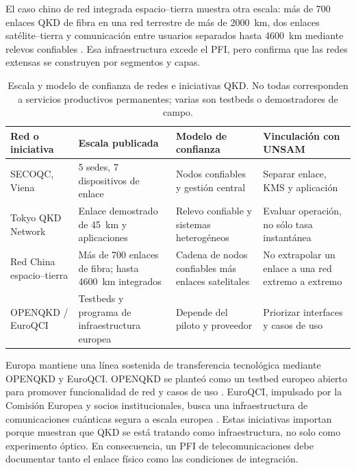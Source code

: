 El caso chino de red integrada espacio--tierra muestra otra escala: más de 700 enlaces QKD de fibra en una red terrestre de más de \SI{2000}{\kilo\meter}, dos enlaces satélite--tierra y comunicación entre usuarios separados hasta \SI{4600}{\kilo\meter} mediante relevos confiables \cite{chen2021integrated}. Esa infraestructura excede el PFI, pero confirma que las redes extensas se construyen por segmentos y capas.

\begin{table}[H]
  \centering
  \small
  \begin{tabularx}{\textwidth}{p{}p{}p{}X}
    \toprule
    Red o iniciativa & Escala publicada & Modelo de confianza & Vinculación con UNSAM \\
    \midrule
    SECOQC, Viena & 5 sedes, 7 dispositivos de enlace & Nodos confiables y gestión central & Separar enlace, KMS y aplicación \\
    Tokyo QKD Network & Enlace demostrado de \SI{45}{\kilo\meter} y aplicaciones & Relevo confiable y sistemas heterogéneos & Evaluar operación, no sólo tasa instantánea \\
    Red China espacio--tierra & Más de 700 enlaces de fibra; hasta \SI{4600}{\kilo\meter} integrados & Cadena de nodos confiables más enlaces satelitales & No extrapolar un enlace a una red extremo a extremo \\
    OPENQKD / EuroQCI & Testbeds y programa de infraestructura europea & Depende del piloto y proveedor & Priorizar interfaces y casos de uso \\
    \bottomrule
  \end{tabularx}
  \caption{Escala y modelo de confianza de redes e iniciativas QKD. No todas corresponden a servicios productivos permanentes; varias son testbeds o demostradores de campo.}
  \label{tab:redes_productivas_qkd}
\end{table}

Europa mantiene una línea sostenida de transferencia tecnológica mediante OPENQKD y EuroQCI. OPENQKD se planteó como un testbed europeo abierto para promover funcionalidad de red y casos de uso \cite{openqkd}. EuroQCI, impulsado por la Comisión Europea y socios institucionales, busca una infraestructura de comunicaciones cuánticas segura a escala europea \cite{euroqciEC}. Estas iniciativas importan porque muestran que QKD se está tratando como infraestructura, no solo como experimento óptico. En consecuencia, un PFI de telecomunicaciones debe documentar tanto el enlace físico como las condiciones de integración.

